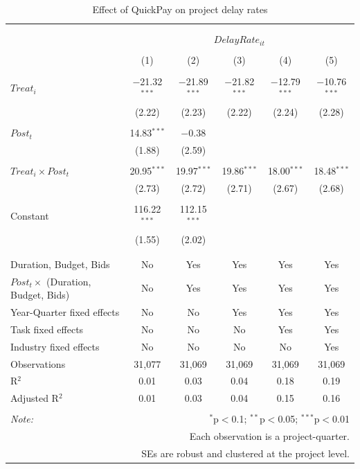 \documentclass[
]{article}
\begin{document}
\begin{table}[H] \centering 
  \caption{Effect of QuickPay on project delay rates} 
  \label{} 
\small 
\begin{tabular}{@{\extracolsep{-2pt}}lccccc} 
\\[-1.8ex]\hline 
\hline \\[-1.8ex] 
\\[-1.8ex] & \multicolumn{5}{c}{$DelayRate_{it}$} \\ 
\\[-1.8ex] & (1) & (2) & (3) & (4) & (5)\\ 
\hline \\[-1.8ex] 
 $Treat_i$ & $-$21.32$^{***}$ & $-$21.89$^{***}$ & $-$21.82$^{***}$ & $-$12.79$^{***}$ & $-$10.76$^{***}$ \\ 
  & (2.22) & (2.23) & (2.22) & (2.24) & (2.28) \\ 
  & & & & & \\ 
 $Post_t$ & 14.83$^{***}$ & $-$0.38 &  &  &  \\ 
  & (1.88) & (2.59) &  &  &  \\ 
  & & & & & \\ 
 $Treat_i \times Post_t$ & 20.95$^{***}$ & 19.97$^{***}$ & 19.86$^{***}$ & 18.00$^{***}$ & 18.48$^{***}$ \\ 
  & (2.73) & (2.72) & (2.71) & (2.67) & (2.68) \\ 
  & & & & & \\ 
 Constant & 116.22$^{***}$ & 112.15$^{***}$ &  &  &  \\ 
  & (1.55) & (2.02) &  &  &  \\ 
  & & & & & \\ 
\hline \\[-1.8ex] 
Duration, Budget, Bids & No & Yes & Yes & Yes & Yes \\ 
$Post_t \times$  (Duration, Budget, Bids) & No & Yes & Yes & Yes & Yes \\ 
Year-Quarter fixed effects & No & No & Yes & Yes & Yes \\ 
Task fixed effects & No & No & No & Yes & Yes \\ 
Industry fixed effects & No & No & No & No & Yes \\ 
Observations & 31,077 & 31,069 & 31,069 & 31,069 & 31,069 \\ 
R$^{2}$ & 0.01 & 0.03 & 0.04 & 0.18 & 0.19 \\ 
Adjusted R$^{2}$ & 0.01 & 0.03 & 0.04 & 0.15 & 0.16 \\ 
\hline 
\hline \\[-1.8ex] 
\textit{Note:}  & \multicolumn{5}{r}{$^{*}$p$<$0.1; $^{**}$p$<$0.05; $^{***}$p$<$0.01} \\ 
 & \multicolumn{5}{r}{Each observation is a project-quarter.} \\ 
 & \multicolumn{5}{r}{SEs are robust and clustered at the project level.} \\ 
\end{tabular} 
\end{table}
\end{document}

